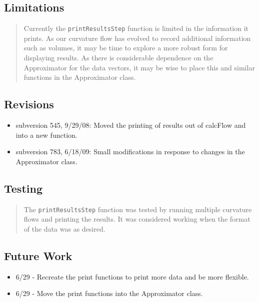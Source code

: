 \documentclass[10pt]{article}%
\begin{document}
\subsection*{Limitations}

\begin{quotation} Currently the \texttt{printResultsStep} function is limited in the information it prints. As our curvature flow has evolved to record additional information such as volumes, it may be time to explore a more robust form for displaying results. As there is considerable dependence on the Approximator for the data vectors, it may be wise to place this and similar functions in the Approximator class.\end{quotation}

\subsection*{Revisions}

\begin{itemize}\item  subversion 545, 9/29/08: Moved the printing of results out of calcFlow and into a new function.
\item  subversion 783, 6/18/09: Small modifications in response to changes in the Approximator class.
\end{itemize}

\subsection*{Testing}

\begin{quotation} The \texttt{printResultsStep} function was tested by running multiple curvature flows and printing the results. It was considered working when the format of the data was as desired.\end{quotation}

\subsection*{Future Work}

\begin{itemize}\item  6/29 - Recreate the print functions to print more data and be more flexible.
\item  6/29 - Move the print functions into the Approximator class.
\end{itemize}
    

%
\end{document}
